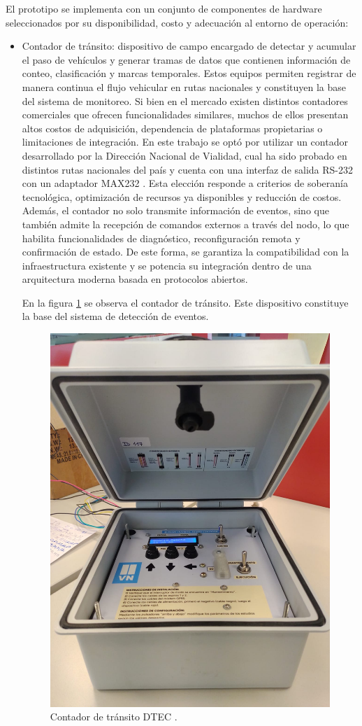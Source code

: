 El prototipo se implementa con un conjunto de componentes de hardware seleccionados por su disponibilidad, costo y adecuación al entorno de operación:

\begin{itemize}

\item  Contador de tránsito: dispositivo de campo encargado de detectar y acumular el paso de vehículos y generar tramas de datos que contienen información de conteo, clasificación y marcas temporales. Estos equipos permiten registrar de manera continua el flujo vehicular en rutas nacionales y constituyen la base del sistema de monitoreo. Si bien en el mercado existen distintos contadores comerciales que ofrecen funcionalidades similares, muchos de ellos presentan altos costos de adquisición, dependencia de plataformas propietarias o limitaciones de integración. En este trabajo se optó por utilizar un contador desarrollado por la Dirección Nacional de Vialidad,  cual ha sido probado en distintos rutas nacionales del país y cuenta con una interfaz de salida RS-232 \cite{tiRS232} con un adaptador MAX232 \cite{max232}. Esta elección responde a criterios de soberanía tecnológica, optimización de recursos ya disponibles y reducción de costos. Además, el contador no solo transmite información de eventos, sino que también admite la recepción de comandos externos a través del nodo, lo que habilita funcionalidades de diagnóstico, reconfiguración remota y confirmación de estado. De este forma, se garantiza la compatibilidad con la infraestructura existente y se potencia su integración dentro de una arquitectura moderna basada en protocolos abiertos.

En la figura \ref{fig:foto_dtec2} se observa el contador de tránsito. Este dispositivo constituye la base del sistema de detección de eventos. 

\begin{figure}[H]
  \centering
  \includegraphics[width=0.5\linewidth]{./Figures/fotoDTEC2.jpeg}
  \caption{Contador de tránsito DTEC \protect\footnotemark.}
  \label{fig:foto_dtec2}
\end{figure}


\end{itemize}
